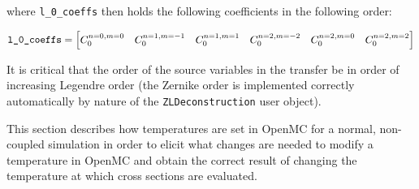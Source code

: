 \documentclass[10pt]{article}
\newcommand{\beq}{\begin{equation}}
\newcommand{\eeq}{\end{equation}}
\newcounter{subsubsubsection}[subsubsection]
\numberwithin{equation}{section} %
\begin{document}
where {\tt l\_0\_coeffs} then holds the following coefficients in the following order:

\beq
\textrm{{\tt l\_0\_coeffs}}= \begin{bmatrix}C_0^{n=0,m=0} & C_0^{n=1, m=-1} & C_0^{n=1,m=1} & C_0^{n=2,m=-2} & C_0^{n=2,m=0} & C_0^{n=2,m=2}\end{bmatrix}
\eeq

It is critical that the order of the source variables in the transfer be in order of increasing Legendre order (the Zernike order is implemented correctly automatically by nature of the {\tt ZLDeconstruction} user object). 

This section describes how temperatures are set in OpenMC for a normal, non-coupled simulation in order to elicit what changes are needed to modify a temperature in OpenMC and obtain the correct result of changing the temperature at which cross sections are evaluated.
\end{document}
